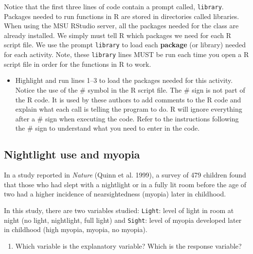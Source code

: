 \documentclass[
]{report}
\providecommand{\tightlist}{%
  \setlength{\itemsep}{0pt}\setlength{\parskip}{0pt}}
\begin{document}
Notice that the first three lines of code contain a prompt called, \texttt{library}. Packages needed to run functions in R are stored in directories called libraries. When using the MSU RStudio server, all the packages needed for the class are already installed. We simply must tell R which packages we need for each R script file. We use the prompt \texttt{library} to load each \textbf{package} (or library) needed for each activity. Note, these \texttt{library} lines MUST be run each time you open a R script file in order for the functions in R to work.

\begin{itemize}
\tightlist
\item
  Highlight and run lines 1--3 to load the packages needed for this activity. Notice the use of the \# symbol in the R script file. The \# sign is not part of the R code. It is used by these authors to add comments to the R code and explain what each call is telling the program to do.
  R will ignore everything after a \# sign when executing the code. Refer to the instructions following the \# sign to understand what you need to enter in the code.
\end{itemize}

\hypertarget{nightlight-use-and-myopia}{%
\subsection*{Nightlight use and myopia}\label{nightlight-use-and-myopia}}

In a study reported in \emph{Nature} (Quinn et al. 1999), a survey of 479 children found that those who had slept with a nightlight or in a fully lit room before the age of two had a higher incidence of nearsightedness (myopia) later in childhood.

In this study, there are two variables studied: \texttt{Light}: level of light in room at night (no light, nightlight, full light) and \texttt{Sight}: level of myopia developed later in childhood (high myopia, myopia, no myopia).

\begin{enumerate}
\def\labelenumi{\arabic{enumi}.}
\tightlist
\item
  Which variable is the explanatory variable? Which is the response variable?
\end{enumerate}

\vspace{0.8in}
\end{document}
